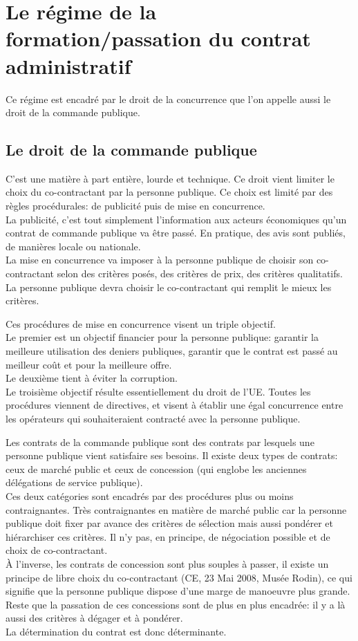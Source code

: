 \documentclass[10pt, a4paper, openany]{book}
\begin{document}
\section{Le régime de la formation/passation du contrat administratif}

Ce régime est encadré par le droit de la concurrence que l'on appelle aussi le droit de la commande publique.

\subsection{Le droit de la commande publique}

C'est une matière à part entière, lourde et technique. Ce droit vient limiter le choix du co-contractant par la personne publique. Ce choix est limité par des règles procédurales: de publicité puis de mise en concurrence. \\
La publicité, c'est tout simplement l'information aux acteurs économiques qu'un contrat de commande publique va être passé. En pratique, des avis sont publiés, de manières locale ou nationale. \\
La mise en concurrence va imposer à la personne publique de choisir son co-contractant selon des critères posés, des critères de prix, des critères qualitatifs. La personne publique devra choisir le co-contractant qui remplit le mieux les critères. 


Ces procédures de mise en concurrence visent un triple objectif. \\
Le premier est un objectif financier pour la personne publique: garantir la meilleure utilisation des deniers publiques, garantir que le contrat est passé au meilleur coût et pour la meilleure offre. \\
Le deuxième tient à éviter la corruption. \\
Le troisième objectif résulte essentiellement du droit de l'UE. Toutes les procédures viennent de directives, et visent à établir une égal concurrence entre les opérateurs qui souhaiteraient contracté avec la personne publique. 


Les contrats de la commande publique sont des contrats par lesquels une personne publique vient satisfaire ses besoins. Il existe deux types de contrats: ceux de marché public et ceux de concession (qui englobe les anciennes délégations de service publique). \\
Ces deux catégories sont encadrés par des procédures plus ou moins contraignantes. Très contraignantes en matière de marché public car la personne publique doit fixer par avance des critères de sélection mais aussi pondérer et hiérarchiser ces critères. Il n'y pas, en principe, de négociation possible et de choix de co-contractant. \\
À l'inverse, les contrats de concession sont plus souples à passer, il existe un principe de libre choix du co-contractant (CE, 23 Mai 2008, Musée Rodin), ce qui signifie que la personne publique dispose d'une marge de manoeuvre plus grande. Reste que la passation de ces concessions sont de plus en plus encadrée: il y a là aussi des critères à dégager et à pondérer. \\
La détermination du contrat est donc déterminante. 
\end{document}
